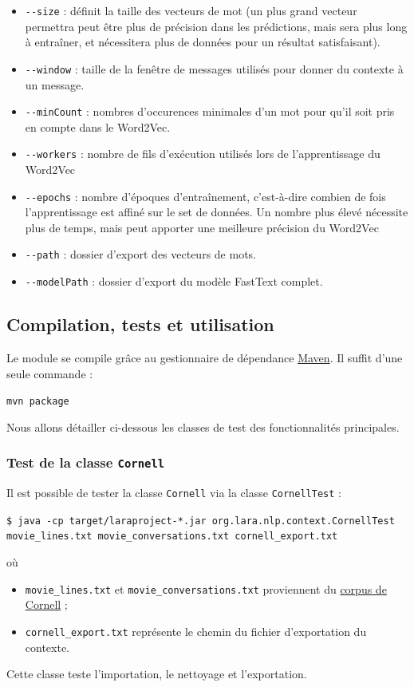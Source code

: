 \documentclass[10pt,a4paper]{article}
\begin{document}
\begin{itemize}
 \item \texttt{-{}-size} : définit la taille des vecteurs de mot (un plus grand vecteur permettra peut être plus de précision dans les prédictions, mais sera plus long à entraîner, et nécessitera plus de données pour un résultat satisfaisant).
 \item \texttt{-{}-window} : taille de la fenêtre de messages utilisés pour donner du contexte à un message.
 \item \texttt{-{}-minCount} : nombres d'occurences minimales d'un mot pour qu'il soit pris en compte dans le Word2Vec.
 \item \texttt{-{}-workers} : nombre de fils d'exécution utilisés lors de l'apprentissage du Word2Vec
 \item \texttt{-{}-epochs} : nombre d'époques d'entraînement, c'est-à-dire combien de fois l'apprentissage est affiné sur le set de données. Un nombre plus élevé nécessite plus de temps, mais peut apporter une meilleure précision du Word2Vec
 \item \texttt{-{}-path} : dossier d'export des vecteurs de mots.
 \item \texttt{-{}-modelPath} : dossier d'export du modèle FastText complet.
\end{itemize}

\subsection{Compilation, tests et utilisation}
Le module se compile grâce au gestionnaire de dépendance \href{https://maven.apache.org/}{Maven}. Il suffit d'une seule commande :
\begin{center}
	\texttt{mvn package}
\end{center}
Nous allons détailler ci-dessous les classes de test des fonctionnalités principales.

\subsubsection{Test de la classe \texttt{Cornell}}
Il est possible de tester la classe \texttt{Cornell} via la classe \texttt{CornellTest} :
\begin{center}
	\texttt{\$ java -cp target/laraproject-*.jar org.lara.nlp.context.CornellTest movie\_lines.txt movie\_conversations.txt cornell\_export.txt}
\end{center}
où
\begin{itemize}
	\item \texttt{movie\_lines.txt} et \texttt{movie\_conversations.txt} proviennent du \href{https://www.cs.cornell.edu/~cristian/Cornell_Movie-Dialogs_Corpus.html}{corpus de Cornell} ;
	\item \texttt{cornell\_export.txt} représente le chemin du fichier d'exportation du contexte.
\end{itemize}
Cette classe teste l'importation, le nettoyage et l'exportation.
\end{document}
